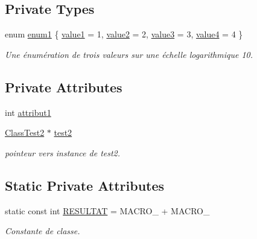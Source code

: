\subsection*{Private Types}
\begin{DoxyCompactItemize}
\item 
enum \hyperlink{class_class_test1_a5dc78bd1ea038f197d380c096fcb57b0}{enum1} \{ \hyperlink{class_class_test1_a5dc78bd1ea038f197d380c096fcb57b0a0083b0845222328b355398da2a243488}{value1} =  1, 
\hyperlink{class_class_test1_a5dc78bd1ea038f197d380c096fcb57b0ac39033ae1c138b9872661da3c8ae32b3}{value2} =  2, 
\hyperlink{class_class_test1_a5dc78bd1ea038f197d380c096fcb57b0a5ca5a05dd2db5a11038e3d889141b8da}{value3} =  3, 
\hyperlink{class_class_test1_a5dc78bd1ea038f197d380c096fcb57b0adb808db2b8b79557f1bca117fdeeaf1c}{value4} =  4
 \}
\begin{DoxyCompactList}\small\item\em Une énumération de trois valeurs sur une échelle logarithmique 10. \item\end{DoxyCompactList}\end{DoxyCompactItemize}
\subsection*{Private Attributes}
\begin{DoxyCompactItemize}
\item 
int \hyperlink{class_class_test1_a2d055181de54f942df1a3e62c5c3cc72}{attribut1}
\item 
\hyperlink{class_class_test2}{ClassTest2} $\ast$ \hyperlink{class_class_test1_a41927c2bf56ea6d6f79b945db9095c9b}{test2}
\begin{DoxyCompactList}\small\item\em pointeur vers instance de test2. \item\end{DoxyCompactList}\end{DoxyCompactItemize}
\subsection*{Static Private Attributes}
\begin{DoxyCompactItemize}
\item 
static const int \hyperlink{class_class_test1_a681620a7f1f9533b4b9b0ad13a84eb62}{RESULTAT} = MACRO\_ + MACRO\_
\begin{DoxyCompactList}\small\item\em Constante de classe. \item\end{DoxyCompactList}\end{DoxyCompactItemize}


